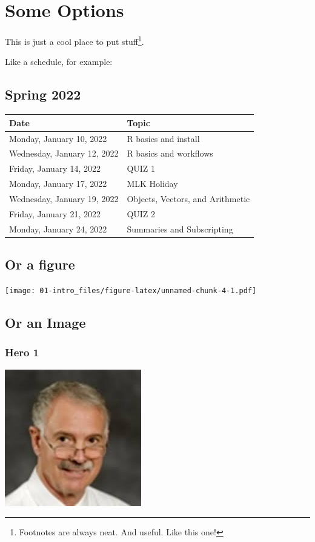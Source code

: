\documentclass[
]{book}
\begin{document}
\hypertarget{some-options}{%
\chapter{Some Options}\label{some-options}}

This is just a cool place to put stuff\footnote{Footnotes are always neat. And useful. Like this one!}.

Like a schedule, for example:

\hypertarget{spring-2022}{%
\section{Spring 2022}\label{spring-2022}}

\begin{longtable}[]{@{}ll@{}}
\toprule
Date & Topic \\
\midrule
\endhead
Monday, January 10, 2022 & R basics and install \\
Wednesday, January 12, 2022 & R basics and workflows \\
Friday, January 14, 2022 & QUIZ 1 \\
Monday, January 17, 2022 & MLK Holiday \\
Wednesday, January 19, 2022 & Objects, Vectors, and Arithmetic \\
Friday, January 21, 2022 & QUIZ 2 \\
Monday, January 24, 2022 & Summaries and Subscripting \\
\bottomrule
\end{longtable}

\hypertarget{or-a-figure}{%
\section{Or a figure}\label{or-a-figure}}

\texttt{[image: 01-intro\_files/figure-latex/unnamed-chunk-4-1.pdf]}

\hypertarget{or-an-image}{%
\section{Or an Image}\label{or-an-image}}

\hypertarget{hero-1}{%
\subsection{Hero 1}\label{hero-1}}

\begin{center}\includegraphics{_images/bob} \end{center}
\end{document}
